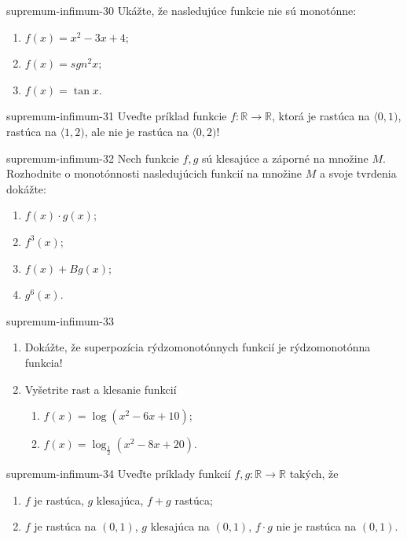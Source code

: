 \begin{defproblem}{supremum-infimum-30}
Ukážte, že nasledujúce funkcie nie sú monotónne:
\begin{enumerate}
\item $f(x)=x^2-3x+4$;
\item $f(x)=sgn^2 x$;
\item $f(x)=\tan x$.
\end{enumerate}
\end{defproblem}

\begin{defproblem}{supremum-infimum-31}
Uveďte príklad funkcie $f:\mathbb{R}\rightarrow\mathbb{R}$, ktorá je rastúca na $\langle 0,1)$, rastúca na $\langle 1,2)$, ale nie je rastúca na $\langle 0,2)$!
\end{defproblem}

\begin{defproblem}{supremum-infimum-32}
Nech funkcie $f,g$ sú klesajúce a záporné na množine $M$. Rozhodnite o monotónnosti nasledujúcich funkcií na množine $M$ a svoje tvrdenia dokážte:
\begin{multicols}{2}
\begin{enumerate}
    \item $f(x)\cdot g(x)$;
    \item $f^3(x)$;
    \item $f(x)+Bg(x)$;
    \item $g^6(x)$.
\end{enumerate}
\end{multicols}
\end{defproblem}

\begin{defproblem}{supremum-infimum-33}
\begin{enumerate}
\item Dokážte, že superpozícia rýdzomonotónnych funkcií je rýdzomonotónna funkcia!
\item Vyšetrite rast a klesanie funkcií 
\begin{enumerate}
\item $f(x)=\log (x^2-6x+10)$;
\item $f(x)=\log_\frac{1}{2}(x^2-8x+20)$.
\end{enumerate}
\end{enumerate}
\end{defproblem}

\begin{defproblem}{supremum-infimum-34}
Uveďte príklady funkcií $f,g:\mathbb{R}\rightarrow\mathbb{R}$ takých, že
\begin{enumerate}
\item $f$ je rastúca, $g$ klesajúca, $f+g$ rastúca;
\item $f$ je rastúca na $(0,1)$, $g$ klesajúca na $(0,1)$, $f\cdot g$ nie je rastúca na $(0,1)$.
\end{enumerate}
\end{defproblem}

